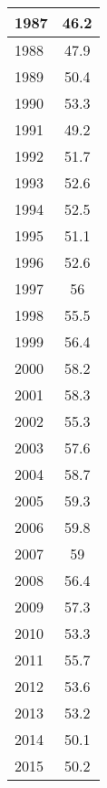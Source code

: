 \documentclass{mcmthesis}
\begin{document}
\begin{appendices}
\begin{minipage}{\textwidth}
\begin{minipage}[t]{0.45\textwidth}
\begin{tabular}{|l|c|}
            1987 & 46.2                       \\ \hline
            1988 & 47.9                       \\ \hline
            1989 & 50.4                       \\ \hline
            1990 & 53.3                       \\ \hline
            1991 & 49.2                       \\ \hline
            1992 & 51.7                       \\ \hline
            1993 & 52.6                       \\ \hline
            1994 & 52.5                       \\ \hline
            1995 & 51.1                       \\ \hline
            1996 & 52.6                       \\ \hline
            1997 & 56                         \\ \hline
            1998 & 55.5                       \\ \hline
            1999 & 56.4                       \\ \hline
            2000 & 58.2                       \\ \hline
            2001 & 58.3                       \\ \hline
            2002 & 55.3                       \\ \hline
            2003 & 57.6                       \\ \hline
            2004 & 58.7                       \\ \hline
            2005 & 59.3                       \\ \hline
            2006 & 59.8                       \\ \hline
            2007 & 59                         \\ \hline
            2008 & 56.4                       \\ \hline
            2009 & 57.3                       \\ \hline
            2010 & 53.3                       \\ \hline
            2011 & 55.7                       \\ \hline
            2012 & 53.6                       \\ \hline
            2013 & 53.2                       \\ \hline
            2014 & 50.1                       \\ \hline
            2015 & 50.2                       \\ \hline
            \end{tabular}
  \end{minipage}
\end{minipage}


\end{appendices}
\end{document}
